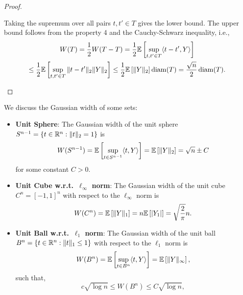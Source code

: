 \begin{proof}
\begin{enumerate}
\begin{equation*}
		      \end{equation*}
		      Taking the supremum over all pairs \(t,t'\in T\) gives the lower bound. The upper bound follows from the property 4 and the Cauchy-Schwarz inequality, i.e.,
		      \begin{multline*}
			      W(T)=\frac{1}{2}W(T-T)=\frac{1}{2}\mathbb{E}\left[\sup_{t,t'\in T}\langle t-t',Y\rangle\right]\\
			      \leq\frac{1}{2}\mathbb{E}\left[\sup_{t,t'\in T}\|t-t'\|_{2}\|Y\|_{2}\right]\leq\frac{1}{2}\mathbb{E}\left[\|Y\|_{2}\right]\operatorname{diam}(T)=\frac{\sqrt{n}}{2}\operatorname{diam}(T).
		      \end{multline*}
	\end{enumerate}
\end{proof}

\begin{example}
	We discuss the Gaussian width of some sets:
	\begin{itemize}
		\item \textbf{Unit Sphere}: The Gaussian width of the unit sphere \(S^{n-1}=\{t\in\mathbb{R}^{n}:\|t\|_{2}=1\}\) is
		      \begin{equation*}
			      W(S^{n-1})=\mathbb{E}\left[\sup_{t\in S^{n-1}}\langle t,Y\rangle\right]=\mathbb{E}\left[\|Y\|_{2}\right]=\sqrt{n}\pm C
		      \end{equation*}
		      for some constant \(C>0\).
		\item \textbf{Unit Cube w.r.t.\ \(\ell_{\infty}\) norm}: The Gaussian width of the unit cube \(C^{n}=[-1,1]^{n}\) with respect to the \(\ell_{\infty}\) norm is
		      \begin{equation*}
			      W(C^{n})=\mathbb{E}\left[\|Y\|_{1}\right]=n\mathbb{E}\left[|Y_{1}|\right]=\sqrt{\frac{2}{\pi}}n.
		      \end{equation*}
		\item \textbf{Unit Ball w.r.t.\ \(\ell_{1}\) norm}: The Gaussian width of the unit ball \(B^{n}=\{t\in\mathbb{R}^{n}:\|t\|_{1}\leq 1\}\) with respect to the \(\ell_{1}\) norm is
		      \begin{equation*}
			      W(B^{n})=\mathbb{E}\left[\sup_{t\in B^{n}}\langle t,Y\rangle\right]=\mathbb{E}\left[\|Y\|_{\infty}\right],
		      \end{equation*}
		      such that,
		      \begin{equation*}
			      c\sqrt{\log n}\leq W(B^{n})\leq C\sqrt{\log n},
		      \end{equation*}
	\end{itemize}
\end{example}

